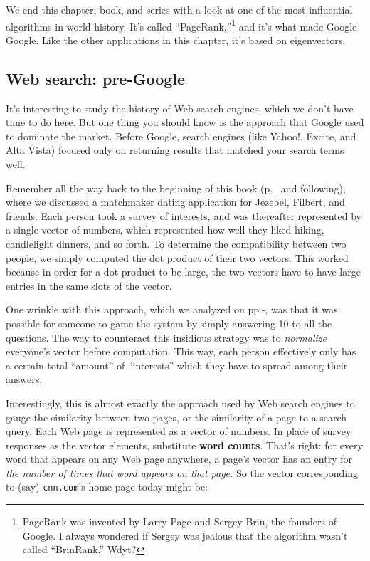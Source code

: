\begin{alttitles}
We end this chapter, book, and series with a look at one of the most
influential algorithms in world history. It's called
``PageRank,''\footnote{PageRank was invented by Larry Page and Sergey Brin, the
founders of Google. I always wondered if Sergey was jealous that the algorithm
wasn't called ``BrinRank.'' Wdyt?} and it's what made Google Google. Like the
other applications in this chapter, it's based on eigenvectors.

\subsection{Web search: pre-Google}


It's interesting to study the history of Web search engines, which we don't
have time to do here. But one thing you should know is the approach that Google
used to dominate the market. Before Google, search engines (like Yahoo!,
Excite, and Alta Vista) focused only on returning results that matched your
search terms well.


Remember all the way back to the beginning of this book
(p.~\pageref{matchmakerExample} and following), where we discussed a matchmaker
dating application for Jezebel, Filbert, and friends. Each person took a survey
of interests, and was thereafter represented by a single vector of numbers,
which represented how well they liked hiking, candlelight dinners, and so
forth. To determine the compatibility between two people, we simply computed
the dot product of their two vectors. This worked because in order for a dot
product to be large, the two vectors have to have large entries in the same
slots of the vector.


One wrinkle with this approach, which we analyzed on
pp.\pageref{matchmakerGameTheSystemStart}-\pageref{matchmakerGameTheSystemEnd},
was that it was possible for someone to game the system by simply answering 10
to all the questions. The way to counteract this insidious strategy was to
\textit{normalize} everyone's vector before computation. This way, each person
effectively only has a certain total ``amount'' of ``interests'' which they
have to spread among their answers.


Interestingly, this is almost exactly the approach used by Web search engines
to gauge the similarity between two pages, or the similarity of a page to a
search query. Each Web page is represented as a vector of numbers. In place of
survey responses as the vector elements, substitute \textbf{word counts}.
That's right: for every word that appears on any Web page anywhere, a page's
vector has an entry for \textit{the number of times that word appears on that
page.} So the vector corresponding to (say) \texttt{cnn.com}'s home page today
might be:


\end{alttitles}
